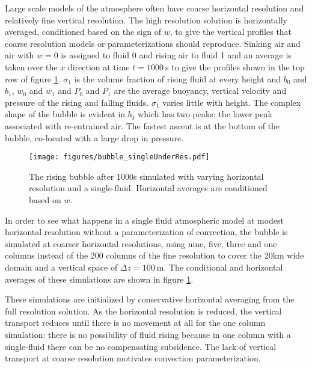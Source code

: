 \documentclass[draft]{agujournal2019}
\begin{document}
Large scale models of the atmosphere often have coarse horizontal resolution and relatively fine vertical resolution. The high resolution solution is horizontally averaged, conditioned based on the sign of $w$, to give the vertical profiles that coarse resolution models or parameterizations should reproduce. Sinking air and air with $w=0$ is assigned to fluid 0 and rising air to fluid 1 and an average is taken over the $x$ direction at time $t=1000\ \text{s}$ to give the profiles
shown in the top row of figure \ref{fig:bubble_singleUnderRes}.
$\sigma_{1}$ is the volume fraction of rising fluid at every height and $b_{0}$ and $b_{1}$, $w_{0}$ and $w_{1}$ and $P_{0}$ and $P_{1}$
are the average buoyancy, vertical velocity and pressure of the rising and falling fluids. 
$\sigma_1$ varies little with height. The complex shape of the bubble is evident in $b_0$ which has two peaks; the lower peak associated with re-entrained air. The fastest ascent is at the bottom of the bubble, co-located with a large drop in pressure. 


\begin{figure}
\noindent \begin{centering}
\texttt{[image: figures/bubble\_singleUnderRes.pdf]}
\par\end{centering}
\caption{The rising bubble after 1000s simulated with varying horizontal resolution
and a single-fluid. Horizontal averages are conditioned based on $w$.
\label{fig:bubble_singleUnderRes}}
\end{figure}

In order to see what happens in a single fluid atmospheric model at modest horizontal resolution without a parameterization of convection, the bubble is simulated at coarser horizontal resolutions, using nine, five, three and one columns instead of the 200 columns of the fine resolution to cover the 20km wide domain and a vertical space of $\Delta z=100\ \text{m}$.
The conditional and horizontal averages of these simulations are shown in figure \ref{fig:bubble_singleUnderRes}.

These simulations are initialized by conservative
horizontal averaging from the full resolution solution. As the horizontal
resolution is reduced, the vertical transport reduces until there
is no movement at all for the one column simulation: there is no possibility
of fluid rising because in one column with a single-fluid there can be no compensating subsidence. The lack of vertical transport
at coarse resolution motivates convection parameterization. 
\end{document}
